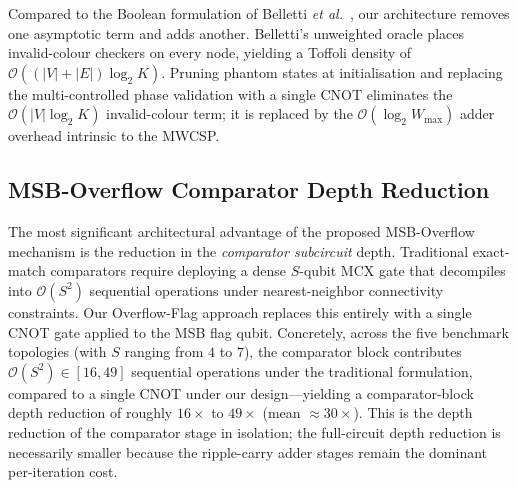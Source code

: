 \documentclass{ieeeaccess}
\begin{document}
Compared to the Boolean formulation of Belletti \textit{et al.}~\cite{belletti2025}, our architecture removes one asymptotic term and adds another. Belletti's unweighted oracle places invalid-colour checkers on every node, yielding a Toffoli density of $\mathcal{O}((|V| + |E|) \log_2 K)$. Pruning phantom states at initialisation and replacing the multi-controlled phase validation with a single CNOT eliminates the $\mathcal{O}(|V| \log_2 K)$ invalid-colour term; it is replaced by the $\mathcal{O}(\log_2 W_{\max})$ adder overhead intrinsic to the MWCSP.

\begin{table}[htbp]
\caption{Theoretical Toffoli and $T$-Gate Estimations (Per Grover Iteration)}
\label{tab:tgate}
\centering
{}
\end{table}

\subsection{MSB-Overflow Comparator Depth Reduction}
The most significant architectural advantage of the proposed MSB-Overflow mechanism is the reduction in the \emph{comparator subcircuit} depth. Traditional exact-match comparators require deploying a dense $S$-qubit MCX gate that decompiles into $\mathcal{O}(S^2)$ sequential operations under nearest-neighbor connectivity constraints. Our Overflow-Flag approach replaces this entirely with a single CNOT gate applied to the MSB flag qubit. Concretely, across the five benchmark topologies (with $S$ ranging from $4$ to $7$), the comparator block contributes $\mathcal{O}(S^2) \in [16, 49]$ sequential operations under the traditional formulation, compared to a single CNOT under our design---yielding a comparator-block depth reduction of roughly $16\times$ to $49\times$ (mean $\approx 30\times$). This is the depth reduction of the comparator stage in isolation; the full-circuit depth reduction is necessarily smaller because the ripple-carry adder stages remain the dominant per-iteration cost.
\end{document}
